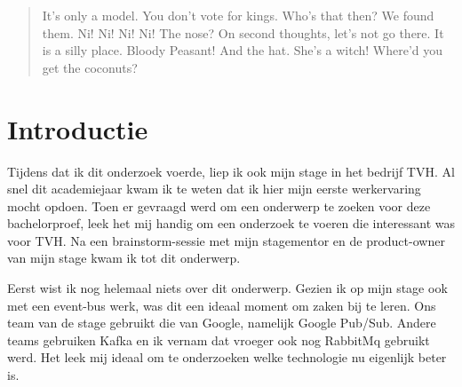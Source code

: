 \documentclass[a0,portrait]{a0poster}
\begin{document}
\begin{multicols}{2} %


\color{HoGentAccent1} %

\begin{abstract}
It's only a model.
You don't vote for kings. Who's that then? We found them. Ni! Ni! Ni! Ni!
The nose? On second thoughts, let's not go there. It is a silly place. Bloody Peasant! And the hat. She's a witch! Where'd you get the coconuts?
\end{abstract}

\color{HoGentAccent1} 
\section*{Introductie}
\color{black}
\color{black}
Tijdens dat ik dit onderzoek voerde, liep ik ook mijn stage in het bedrijf TVH. Al snel dit academiejaar kwam ik te weten dat ik hier mijn eerste werkervaring mocht opdoen. Toen er gevraagd werd om een onderwerp te zoeken voor deze bachelorproef, leek het mij handig om een onderzoek te voeren die interessant was voor TVH. Na een brainstorm-sessie met mijn stagementor en de product-owner van mijn stage kwam ik tot dit onderwerp.

Eerst wist ik nog helemaal niets over dit onderwerp. Gezien ik op mijn stage ook met een event-bus werk, was dit een ideaal moment om zaken bij te leren. Ons team van de stage gebruikt die van Google, namelijk Google Pub/Sub. Andere teams gebruiken Kafka en ik vernam dat vroeger ook nog RabbitMq gebruikt werd. Het leek mij ideaal om te onderzoeken welke technologie nu eigenlijk beter is.

\color{Black} %
\color{HoGentAccent1} 

\end{multicols}
\end{document}
